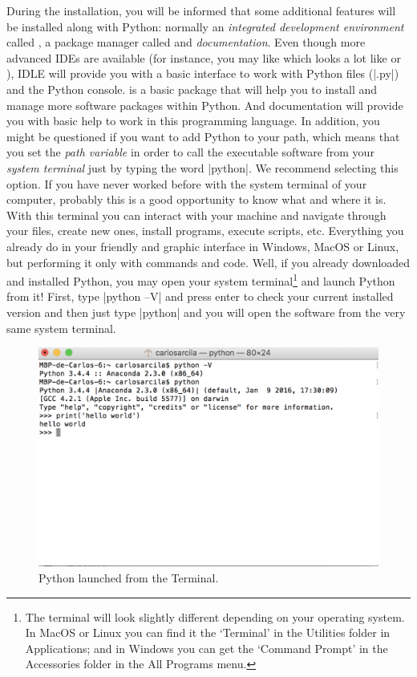 During the installation, you will be informed that some additional
features will be installed along with Python: normally an
\emph{integrated development environment} called , a package
manager called  and \emph{documentation}. Even though more
advanced IDEs are available (for instance, you may like 
which looks a lot like  or ), IDLE will
provide you with a basic interface to work with Python files (|.py|)
and the Python console.  is a basic package that will help
you to install and manage more software packages within Python. And
documentation will provide you with basic help to work in this
programming language.  In addition, you might be questioned if you
want to add Python to your path, which means that you set the
\emph{path variable} in order to call the executable software from
your \emph{system terminal} just by typing the word |python|. We
recommend selecting this option.  If you have never worked before with
the system terminal of your computer, probably this is a good
opportunity to know what and where it is. With this terminal you can
interact with your machine and navigate through your files, create new
ones, install programs, execute scripts, etc.  Everything you already
do in your friendly and graphic interface in Windows, MacOS or Linux,
but performing it only with commands and code. Well, if you already
downloaded and installed Python, you may open your system
terminal\footnote{The terminal will look slightly different depending
  on your operating system. In MacOS or Linux you can find it the
  `Terminal' in the Utilities folder in Applications; and in Windows
  you can get the `Command Prompt' in the Accessories folder in the
  All Programs menu.}  and launch Python from it! First, type
|python --V| and press enter to check your current installed version and then
just type |python| and you will open the software from the very same
system terminal.

\begin{figure}
\centering
\includegraphics[width=0.9\linewidth]{figures/ch3_python_from_terminal}
\caption{Python launched from the Terminal.}
\label{fig:python_from_terminal}
\end{figure}

